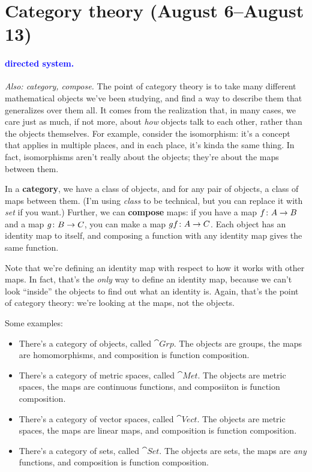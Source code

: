 \documentclass[11pt,paper=letter]{scrartcl}
\renewcommand\wp[1]{\paragraph{\textcolor{Blue}{#1.}} \hspace{-1em}}
\newcommand\wl[1]{\label{w:#1}}
\newcommand\oww[1]{\textit{Also: #1.}}
\begin{document}
\section{Category theory (August 6--August 13)}

\wp{directed system}
\wl{directed system}
\oww{category, compose}
The point of category theory is to take many different mathematical objects we've been studying, and find a way to describe them that generalizes over them all. It comes from the realization that, in many cases, we care just as much, if not more, about \textit{how} objects talk to each other, rather than the objects themselves. For example, consider the isomorphism: it's a concept that applies in multiple places, and in each place, it's kinda the same thing. In fact, isomorphisms aren't really about the objects; they're about the maps between them.

In a \textbf{category}, we have a class of objects, and for any pair of objects, a class of maps between them. (I'm using \textit{class} to be technical, but you can replace it with \textit{set} if you want.) Further, we can \textbf{compose} maps: if you have a map $f \colon A \to B$ and a map $g \colon B \to C$, you can make a map $gf \colon A \to C$. Each object has an identity map to itself, and composing a function with any identity map gives the same function.

Note that we're defining an identity map with respect to how it works with other maps. In fact, that's the \textit{only} way to define an identity map, because we can't look ``inside'' the objects to find out what an identity is. Again, that's the point of category theory: we're looking at the maps, not the objects.

Some examples:

\begin{itemize}
  \item There's a category of objects, called $ \cat{Grp} $. The objects are groups, the maps are homomorphisms, and composition is function composition.
  \item There's a category of metric spaces, called $ \cat{Met} $. The objects are metric spaces, the maps are continuous functions, and composiiton is function composition.
  \item There's a category of vector spaces, called $ \cat{Vect} $. The objects are metric spaces, the maps are linear maps, and composition is function composition.
  \item There's a category of sets, called $ \cat{Set} $. The objects are sets, the maps are \textit{any} functions, and composition is function composition.
\end{itemize}
\end{document}
